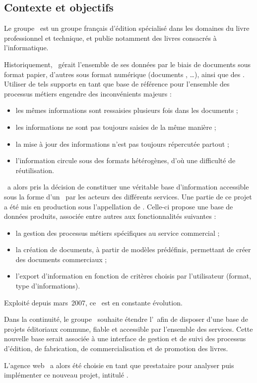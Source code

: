 \subsection{Contexte et objectifs}
\label{section:eyrolles_contexte}

Le groupe \aey\ est un groupe français d'édition spécialisé dans les domaines du livre professionnel et technique, et publie notamment des livres consacrés à l'informatique.

Historiquement, \aey\ gérait l'ensemble de ses données par le biais de documents sous format papier, d'autres sous format numérique (documents \amsword, \amsexcel\ldots), ainsi que des \aemails. Utiliser de tels supports en tant que base de référence pour l'ensemble des processus métiers engendre des inconvénients majeurs :

\begin{itemize}
	\item les mêmes informations sont ressaisies plusieurs fois dans les documents ;
	\item les informations ne sont pas toujours saisies de la même manière ;
	\item la mise à jour des informations n'est pas toujours répercutée partout ;
	\item l'information circule sous des formats hétérogènes, d'où une difficulté de réutilisation.
\end{itemize}

\aey\ a alors pris la décision de constituer une véritable base d'information accessible sous la forme d'un \aintranet\ par les acteurs des différents services. Une partie de ce projet a été mis en production sous l'appellation de \emph{\alotun}. Celle-ci propose une base de données produits, associée entre autres aux fonctionnalités suivantes :

\begin{itemize}
	\item la gestion des processus métiers spécifiques au service commercial ;
	\item la création de documents, à partir de modèles prédéfinis, permettant de créer des documents commerciaux ;
	\item l'export d'information en fonction de critères choisis par l'utilisateur (format, type d'informations).
\end{itemize}

Exploité depuis mars~2007, ce \alotun\ est en constante évolution.

Dans la continuité, le groupe \aey\ souhaite étendre l'\aey\ afin de disposer d'une base de projets éditoriaux commune, fiable et accessible par l'ensemble des services. Cette nouvelle base serait associée à une interface de gestion et de suivi des processus d'édition, de fabrication, de commercialisation et de
promotion des livres.

L'agence web \asl\ a alors été choisie en tant que prestataire pour analyser puis implémenter ce nouveau projet, intitulé \emph{\alotdeux}.
